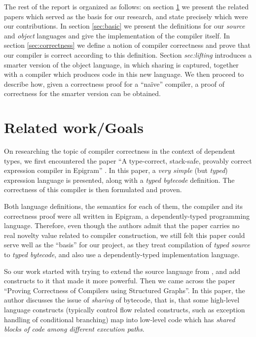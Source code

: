 \documentclass[a4paper]{article}
\begin{document}
        The rest of the report is organized as follows: on section \ref{sec:goals} we present the
        related papers which served as the basis for our research, and state precisely which were
        our contributions. In section \ref{sec:basic} we present the definitions for our 
        \emph{source} and \emph{object} languages and give the implementation of the compiler itself.
        In section \ref{sec:correctness} we define a notion of compiler correctness and prove that our compiler
        is correct according to this definition. Section \emph{sec:lifting} introduces a smarter version of 
        the object language, in which sharing is captured, together with a compiler which
        produces code in this new language. We then proceed to describe how, given a correctness proof for a 
        ``naïve'' compiler, a proof of correctness for the smarter version can be obtained.

    \section{Related work/Goals}
    \label{sec:goals}
        On researching the topic of compiler correctness in the context of dependent types, we first encountered
        the paper ``A type-correct, stack-safe, provably correct expression compiler in Epigram'' \cite{typed-stack-safe-compiler}.
        In this paper, a \emph{very simple} (but \emph{typed}) expression language is presented,
        along with a \emph{typed bytecode} definition. The correctness of this compiler is then formulated and proven.
        
        Both language definitions, the semantics for each of them, the compiler and its correctness proof
        were all written in Epigram, a dependently-typed programming language. Therefore,
        even though the authors admit that the paper carries no real novelty value related to compiler
        construction, we still felt this paper could serve well as the ``basis'' for our project, as they
        treat compilation of \emph{typed source} to \emph{typed bytecode}, and also use a dependently-typed
        implementation language.

        So our work started with trying to extend the source language from \cite{typed-stack-safe-compiler},
        and add constructs to it that made it more powerful. Then we came across the paper
        ``Proving Correctness of Compilers using Structured Graphs''\cite{compiler-correctness-structured-graphs}.
        In this paper, the author discusses the issue of \emph{sharing} of bytecode, that is, that
        some high-level language constructs (typically control flow related constructs,
        such as exception handling of conditional branching) map into low-level code which has
        \emph{shared blocks of code among different execution paths}.
\end{document}
